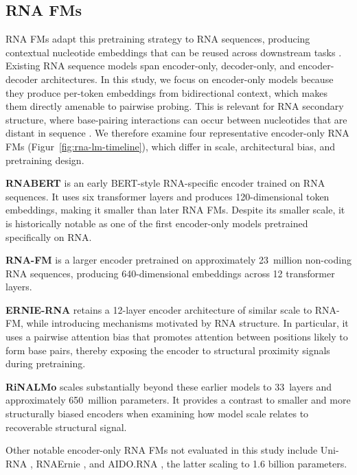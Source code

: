 \documentclass[logo,bsc,singlespacing,parskip]{infthesis}
\begin{document}
\subsection{RNA FMs}
RNA FMs adapt this pretraining strategy to RNA sequences, producing contextual nucleotide embeddings that can be reused across downstream tasks \citep{chen2022rnafm, yin2025ernie, penic2025rinalmo}. Existing RNA sequence models span encoder-only, decoder-only, and encoder-decoder architectures.
In this study, we focus on encoder-only models because they 
produce per-token embeddings from bidirectional context, which 
makes them directly amenable to pairwise probing. This is 
relevant for RNA secondary structure, where base-pairing 
interactions can occur between nucleotides that are distant in 
sequence \citep{tinoco1999how}.
We therefore examine four representative encoder-only RNA FMs (Figur~\ref{fig:rna-lm-timeline}), which differ in scale, architectural bias, and pretraining design.

\textbf{RNABERT} \citep{akiyama2022rnabert} is an early BERT-style RNA-specific encoder trained on RNA sequences. It uses six transformer layers and produces 120-dimensional token
embeddings, making it smaller than later RNA FMs. Despite
its smaller scale, it is historically notable as one of the first encoder-only models pretrained specifically on RNA.

\textbf{RNA-FM} \citep{chen2022rnafm} is a larger encoder pretrained on approximately 23~million non-coding RNA sequences, producing 640-dimensional embeddings across 12 transformer layers.
 
\textbf{ERNIE-RNA} \citep{yin2025ernie} retains a 12-layer encoder architecture of similar scale to RNA-FM, while introducing mechanisms motivated by RNA structure. In particular, it uses a pairwise attention bias that promotes attention between positions likely to form base pairs, thereby exposing the encoder to structural proximity signals during pretraining.

\textbf{RiNALMo} \citep{penic2025rinalmo} scales substantially beyond these earlier models to 33~layers and approximately 650~million parameters. It provides a contrast to smaller and more structurally biased encoders when examining how model scale relates to recoverable structural signal.

Other notable encoder-only RNA FMs not evaluated in this study include
Uni-RNA \citep{wang2023unirna}, RNAErnie \citep{wang2024rnaernie}, and
AIDO.RNA \citep{he2025aidorna}, the latter scaling to 1.6 billion
parameters.
\end{document}
